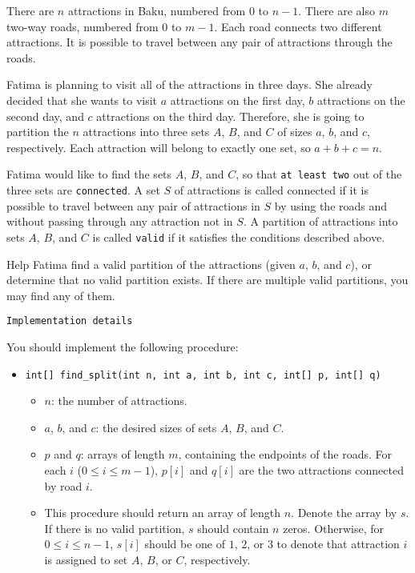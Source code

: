 There are $n$ attractions in Baku, numbered from $0$ to $n-1$.
There are also $m$ two-way roads, numbered from $0$ to $m-1$.
Each road connects two different attractions.
It is possible to travel between any pair of attractions through the roads.

Fatima is planning to visit all of the attractions in three days.
She already decided that she wants to visit $a$ attractions on the first day, $b$ attractions on the second day, and $c$ attractions on the third day.
Therefore, she is going to partition the $n$ attractions into three sets $A$, $B$, and $C$ of sizes $a$, $b$, and $c$, respectively.
Each attraction will belong to exactly one set, so $a + b + c = n$.

Fatima would like to find the sets $A$, $B$, and $C$, so that \texttt{at least two} out of the three sets are \texttt{connected}.
A set $S$ of attractions is called connected if it is possible to travel between any pair of attractions in $S$ by using the roads and without passing through any attraction not in $S$.
A partition of attractions into sets $A$, $B$, and $C$ is called \texttt{valid} if it satisfies the conditions described above.

Help Fatima find a valid partition of the attractions (given $a$, $b$, and $c$), or determine that no valid partition exists.
If there are multiple valid partitions, you may find any of them.

\texttt{Implementation details}

You should implement the following procedure:

\begin{itemize}
\item \texttt{int[] find\_split(int n, int a, int b, int c, int[] p, int[] q)}
\begin{itemize}
\item $n$: the number of attractions.
\item $a$, $b$, and $c$: the desired sizes of sets $A$, $B$, and $C$.
\item $p$ and $q$: arrays of length $m$, containing the endpoints of the roads.
For each $i$ ($0 \leq i \leq m-1$), $p[i]$ and $q[i]$ are the two attractions connected by road $i$.
\item This procedure should return an array of length $n$. Denote the array by $s$.
If there is no valid partition, $s$ should contain $n$ zeros.
Otherwise, for $0 \leq i \leq n-1$, $s[i]$ should be one of $1$, $2$, or $3$ to denote that attraction $i$ is assigned to set $A$, $B$, or $C$, respectively.
\end{itemize}
\end{itemize}



